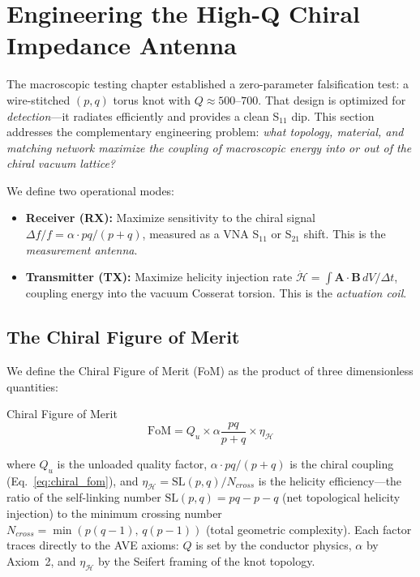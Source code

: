 \section{Engineering the High-Q Chiral Impedance Antenna}
\label{sec:high_q_chiral}

The macroscopic testing chapter established a zero-parameter falsification test: a wire-stitched $(p,q)$ torus knot with $Q \approx 500$--$700$. That design is optimized for \textit{detection}---it radiates efficiently and provides a clean S$_{11}$ dip. This section addresses the complementary engineering problem: \textit{what topology, material, and matching network maximize the coupling of macroscopic energy into or out of the chiral vacuum lattice?}

We define two operational modes:
\begin{itemize}
    \item \textbf{Receiver (RX):} Maximize sensitivity to the chiral signal $\Delta f/f = \alpha \cdot pq/(p+q)$, measured as a VNA S$_{11}$ or S$_{21}$ shift. This is the \textit{measurement antenna}.
    \item \textbf{Transmitter (TX):} Maximize helicity injection rate $\dot{\mathcal{H}} = \int \mathbf{A} \cdot \mathbf{B}\, dV / \Delta t$, coupling energy into the vacuum Cosserat torsion. This is the \textit{actuation coil}.
\end{itemize}

\subsection{The Chiral Figure of Merit}

We define the Chiral Figure of Merit (FoM) as the product of three dimensionless quantities:
\begin{resultbox}{Chiral Figure of Merit}
\begin{equation}
    \text{FoM} = Q_u \times \alpha \frac{pq}{p+q} \times \eta_{\mathcal{H}}
    \label{eq:chiral_fom}
\end{equation}
\end{resultbox}
where $Q_u$ is the unloaded quality factor, $\alpha \cdot pq/(p+q)$ is the chiral coupling (Eq.~\ref{eq:chiral_fom}), and $\eta_{\mathcal{H}} = \text{SL}(p,q) / N_{cross}$ is the helicity efficiency---the ratio of the self-linking number $\text{SL}(p,q) = pq - p - q$ (net topological helicity injection) to the minimum crossing number $N_{cross} = \min(p(q-1),\, q(p-1))$ (total geometric complexity). Each factor traces directly to the AVE axioms: $Q$ is set by the conductor physics, $\alpha$ by Axiom~2, and $\eta_{\mathcal{H}}$ by the Seifert framing of the knot topology.

